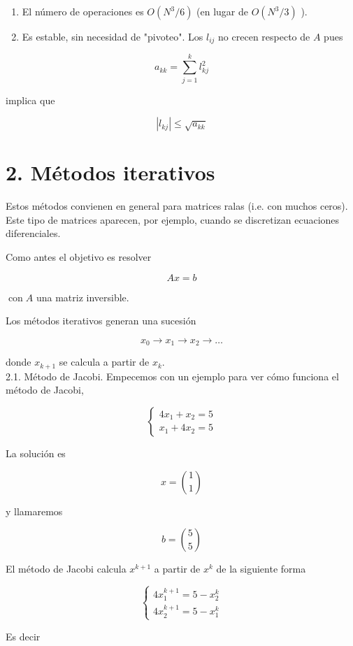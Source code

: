\documentclass[10pt]{article}
\begin{document}
\begin{enumerate}
  \item El número de operaciones es $O\left(N^{3} / 6\right)$ (en lugar de $O\left(N^{3} / 3\right)$ ).
  \item Es estable, sin necesidad de "pivoteo". Los $l_{i j}$ no crecen respecto de $A$ pues
\end{enumerate}

$$
a_{k k}=\sum_{j=1}^{k} l_{k j}^{2}
$$

implica que

$$
\left|l_{k j}\right| \leq \sqrt{a_{k k}}
$$

\section*{2. Métodos iterativos}
Estos métodos convienen en general para matrices ralas (i.e. con muchos ceros). Este tipo de matrices aparecen, por ejemplo, cuando se discretizan ecuaciones diferenciales.

Como antes el objetivo es resolver

$$
A x=b
$$

$\operatorname{con} A$ una matriz inversible.

Los métodos iterativos generan una sucesión

$$
x_{0} \rightarrow x_{1} \rightarrow x_{2} \rightarrow \ldots
$$

donde $x_{k+1}$ se calcula a partir de $x_{k}$.\\
2.1. Método de Jacobi. Empecemos con un ejemplo para ver cómo funciona el método de Jacobi,

$$
\left\{\begin{array}{l}
4 x_{1}+x_{2}=5 \\
x_{1}+4 x_{2}=5
\end{array}\right.
$$

La solución es

$$
x=\binom{1}{1}
$$

y llamaremos

$$
b=\binom{5}{5}
$$

El método de Jacobi calcula $x^{k+1}$ a partir de $x^{k}$ de la siguiente forma

$$
\left\{\begin{array}{l}
4 x_{1}^{k+1}=5-x_{2}^{k} \\
4 x_{2}^{k+1}=5-x_{1}^{k}
\end{array}\right.
$$

Es decir
\end{document}
